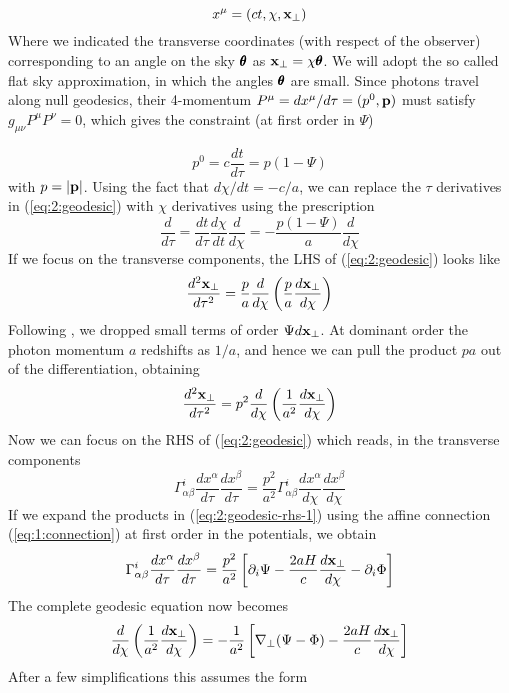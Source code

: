 \begin{equation}
\label{eq:2:coord}
x^{\mu} = (ct,\chi,\mathbf{x}_\perp)
\end{equation}
%
Where we indicated the transverse coordinates (with respect of the observer) corresponding to an angle on the sky $\pmb{\theta}$ as $\mathbf{x}_\perp=\chi\pmb{\theta}$. We will adopt the so called flat sky approximation, in which the angles $\pmb{\theta}$ are small. Since photons travel along null geodesics, their 4-momentum $P^\mu=dx^\mu/d\tau=(p^0,\mathbf{p})$ must satisfy $g_{\mu\nu}P^{\mu}P^{\nu}=0$, which gives the constraint (at first order in $\Psi$)

\begin{equation}
\label{eq:2:nullconstr}
p^0 = c\frac{dt}{d\tau} = p(1-\Psi)
\end{equation} 
%
with $p=\vert\mathbf{p}\vert$. Using the fact that $d\chi/dt = -c/a$, we can replace the $\tau$ derivatives in (\ref{eq:2:geodesic}) with $\chi$ derivatives using the prescription
\begin{equation}
\label{eq:2:tau2chi}
\frac{d}{d\tau} = \frac{dt}{d\tau}\frac{d\chi}{dt}\frac{d}{d\chi} = -\frac{p(1-\Psi)}{a}\frac{d}{d\chi}
\end{equation}
%
If we focus on the transverse components, the LHS of (\ref{eq:2:geodesic}) looks like
\begin{equation}
\label{eq:2:geodesic-lhs-1}
\frac{d^2\mathbf{x}_\perp}{d\tau^2} = \frac{p}{a}\frac{d}{d\chi}\left(\frac{p}{a}\frac{d\mathbf{x}_\perp}{d\chi}\right)
\end{equation}
%
Following \citep{Dodelson-C11}, we dropped small terms of order $\Psi d\mathbf{x}_\perp$. At dominant order the photon momentum $a$ redshifts as $1/a$, and hence we can pull the product $pa$ out of the differentiation, obtaining 
\begin{equation}
\label{eq:2:geodesic-lhs-2}
\frac{d^2\mathbf{x}_\perp}{d\tau^2} = p^2\frac{d}{d\chi}\left(\frac{1}{a^2}\frac{d\mathbf{x}_\perp}{d\chi}\right)
\end{equation}
%
Now we can focus on the RHS of (\ref{eq:2:geodesic}) which reads, in the transverse components
\begin{equation}
\label{eq:2:geodesic-rhs-1}
\Gamma_{\alpha\beta}^i \frac{d x^\alpha}{d\tau}\frac{d x^\beta}{d\tau} = \frac{p^2}{a^2} \Gamma_{\alpha\beta}^i \frac{d x^\alpha}{d\chi}\frac{d x^\beta}{d\chi}
\end{equation}
%
If we expand the products in (\ref{eq:2:geodesic-rhs-1}) using the affine connection (\ref{eq:1:connection}) at first order in the potentials, we obtain
\begin{equation}
\label{eq:2:geodesic-rhs-2}
\Gamma_{\alpha\beta}^i \frac{d x^\alpha}{d\tau}\frac{d x^\beta}{d\tau} = \frac{p^2}{a^2}\left[\partial_i\Psi-\frac{2aH}{c}\frac{d\mathbf{x}_\perp}{d\chi} -\partial_i\Phi \right]
\end{equation}
%
The complete geodesic equation now becomes 
\begin{equation}
\label{eq:2:geodesic-fo-1}
\frac{d}{d\chi}\left(\frac{1}{a^2}\frac{d\mathbf{x}_\perp}{d\chi}\right) = -\frac{1}{a^2}\left[\nabla_\perp(\Psi-\Phi)-\frac{2aH}{c}\frac{d\mathbf{x}_\perp}{d\chi}\right]
\end{equation}
%
After a few simplifications this assumes the form 

